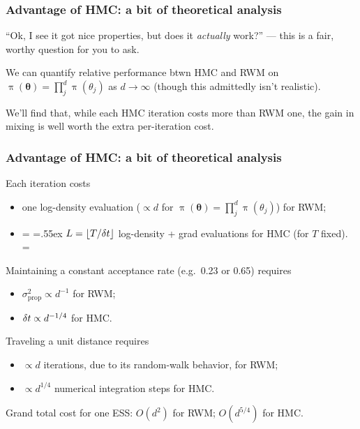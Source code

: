 \documentclass[18pt]{beamer}
\newenvironment{tightItemize}[1][]{%
  \vspace{-.3\baselineskip}%
  \begin{itemize}[#1]
  \addtolength\itemsep{-.1\baselineskip}
}{
  \end{itemize}
}
\newcommand{\titleSmallCap}[1]{{\fontsize{12}{14}\selectfont  \MakeUppercase{#1}}}
\newcommand{\smallCap}[1]{{\small \MakeUppercase{#1}}}
\newcommand{\tightSpacing}[2][.55ex]{%
  \begingroup%
    \dimen0=\fontdimen2\font
    \fontdimen2\font=#1
    #2%
    \fontdimen2\font=\dimen0
  \endgroup%
}
\newcommand{\integTime}{T}
\DeclareMathOperator{\density}{\pi}
\newcommand{\param}{\theta}
\newcommand{\bparam}{\bm{\theta}}
\newcommand{\hmc}{{\small HMC}}
\newcommand{\nParam}{d}
\begin{document}
\renewcommand{\frametitleText}{Advantage of \titleSmallCap{hmc}: a bit of theoretical analysis}
\begin{frame}
\frametitle{\frametitleText}
``Ok, I see it got nice properties, but does it \textit{actually} work?'' 
--- this is a fair, worthy question for you to ask.

\pause%
\medskip
We can quantify relative performance btwn \hmc{} and \smallCap{rwm} on $\density(\bparam) = \prod_{j}^{\nParam} \density(\param_j)$ as $\nParam \to \infty$ (though this admittedly isn't realistic).\\
{\hfill \citep{creutz1988global_monte_carlo, beskos2013optimal_hmc}}

\pause%
\medskip
We'll find that, while each \hmc{} iteration costs more than \smallCap{rwm} one, the gain in mixing is well worth the extra per-iteration cost.
\end{frame}


\begin{frame}
\frametitle{\frametitleText}
Each iteration costs 
\vspace*{-.1\baselineskip}%
\begin{tightItemize}
\item one log-density evaluation ($\propto \nParam$ for $\density(\bparam) = \prod_{j}^{\nParam} \density(\param_j)$) for \smallCap{rwm};
\item \tightSpacing{%
	$\numIntegStep = \lfloor \integTime / \stepsize \rfloor$ log-density + grad evaluations for \smallCap{hmc} (for $\integTime$ fixed).
	}%
\end{tightItemize}

\pause%
\vspace*{1.5pt}
Maintaining a constant acceptance rate (e.g.\ 0.23 or 0.65) requires
\vspace*{-.1\baselineskip}%
\begin{tightItemize}
\item $\sigma_{\mathrm{prop}}^2 \propto \nParam^{-1}$ for \smallCap{rwm}; 
\item $\stepsize \propto \nParam^{-1/4}$ for \smallCap{hmc}.
\end{tightItemize}

\pause%
\vspace*{1.5pt}
Traveling a unit distance requires
\vspace*{-.1\baselineskip}%
\begin{tightItemize}
\item $\propto \nParam$ iterations, due to its random-walk behavior, for \smallCap{rwm}; 
\item $\propto \nParam^{1/4}$ numerical integration steps for \smallCap{hmc}.
\end{tightItemize}

\pause%
\vspace*{2pt}
Grand total cost for one \smallCap{ess}: $O(\nParam^2)$ for \smallCap{rwm}; $O(\nParam^{5/4})$ for \hmc{}.
\end{frame}
\end{document}
